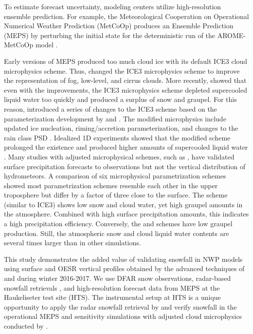 \documentclass{ametsocV5}
\begin{document}
    To estimate forecast uncertainty, modeling centers utilize high-resolution ensemble prediction. For example, the Meteorological Cooperation on Operational Numerical Weather Prediction (MetCoOp) produces an Ensemble Prediction (MEPS) by perturbing the initial state for the deterministic run of the  AROME-MetCoOp model \citep[AROME-Applications of Research to Operations at Mesoscale;][]{frogner_convection-permitting_2019}. 
    
    Early versions of MEPS produced too much cloud ice with its default ICE3 cloud microphysics scheme. Thus, \citet{muller_arome-metcoop:_2017} changed the ICE3 microphysics scheme to improve the representation of fog, low-level, and cirrus clouds. More recently, \citet{engdahl_improving_2020} showed that even with the improvements, the ICE3 microphysics scheme depleted supercooled liquid water too quickly and produced a surplus of snow and graupel. For this reason, \citet{engdahl_improving_2020} introduced a series of changes to the ICE3 scheme based on the parameterization development by \citet{thompson_explicit_2004} and \citet{thompson_explicit_2008}. The modified microphysics include updated ice nucleation, riming/accretion parameterization, and changes to the rain class PSD \citep{engdahl_improving_2020}. Idealized 1D experiments showed that the modified scheme prolonged the existence and produced higher amounts of supercooled liquid water \citep{engdahl_improving_2020}. Many studies with adjusted microphysical schemes, such as \citet{liu_high-resolution_2011}, have validated surface precipitation forecasts to observations but not the vertical distribution of hydrometeors. A comparison of six microphysical parametrization schemes showed most parametrization schemes resemble each other in the upper troposphere but differ by a factor of three close to the surface. The \citet{lin_bulk_1983} scheme (similar to ICE3) shows low snow and cloud water, yet high graupel amounts in the atmosphere. Combined with high surface precipitation amounts, this indicates a high precipitation efficiency. Conversely, the \citet{thompson_explicit_2008} and \citet{morrison_impact_2009} schemes have low graupel production. Still, the atmospheric snow and cloud liquid water contents are several times larger than in other simulations. 

    
    This study demonstrates the added value of validating snowfall in NWP models using surface and OESR vertical profiles obtained by the advanced techniques of \citet{cooper_variational_2017} and \citet{schirle_estimation_2019} during winter 2016-2017. We use DFAR snow observations, radar-based snowfall retrievals \citep{cooper_variational_2017,schirle_estimation_2019}, and high-resolution forecast data from MEPS at the Haukeliseter test site (HTS). The instrumental setup at HTS is a unique opportunity to apply the radar snowfall retrieval by \citet{schirle_estimation_2019} and verify snowfall in the operational MEPS and sensitivity simulations with adjusted cloud microphysics conducted by \citet{engdahl_effects_2020}.
    
\end{document}
